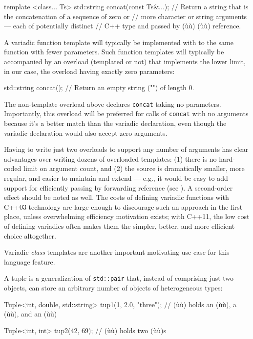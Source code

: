 \begin{emcppslisting}
template <class... Ts>
std::string concat(const Ts&...);
     // Return a string that is the concatenation of a sequence of zero or
     // more character or string arguments --- each of potentially distinct
     // C++ type and passed by (ù{}ù) (ù{}ù) reference.
\end{emcppslisting}
    

\noindent A variadic function template will typically be implemented with
 to the same function with fewer parameters. Such
function templates will typically be accompanied by an overload
(templated or not) that implements the lower limit, in our case, the
overload having exactly zero parameters:

\begin{emcppslisting}
std::string concat();
    // Return an empty string ("") of length 0.
\end{emcppslisting}
    

\noindent The non-template overload above declares \lstinline!concat! taking no
parameters. Importantly, this overload will be preferred for calls of
\lstinline!concat! with no arguments because it's a better match than the
variadic declaration, even though the variadic declaration would also
accept zero arguments.

Having to write just two overloads to support any number of arguments
has clear advantages over writing dozens of overloaded templates: (1)
there is no hard-coded limit on argument count, and (2) the source is
dramatically smaller, more regular, and easier to maintain and extend
--- e.g., it would be easy to add support for efficiently passing by
forwarding reference (see ). A
second-order effect should be noted as well. The costs of defining
variadic functions with C++03 technology are large enough to discourage
such an approach in the first place, unless overwhelming efficiency
motivation exists; with C++11, the low cost of defining variadics often
makes them the simpler, better, and more efficient choice altogether.

Variadic \emph{class} templates are another important motivating use
case for this language feature.

A tuple is a generalization of \lstinline!std::pair! that, instead of
comprising just two objects, can store an arbitrary number of objects of
heterogeneous types:

\begin{emcppslisting}
Tuple<int, double, std::string> tup1(1, 2.0, "three");
    // (ù{}ù) holds an (ù{}ù), a (ù{}ù), and an (ù{}ù)

Tuple<int, int> tup2(42, 69);
    // (ù{}ù) holds two (ù{}ù)s
\end{emcppslisting}
    

